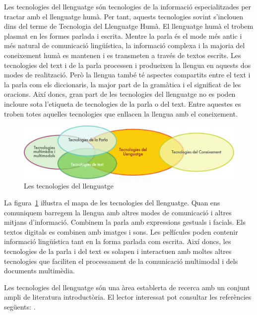 \begin{multicols}{2}

Les tecnologies del llenguatge són tecnologies de la informació especialitzades per tractar amb el llenguatge humà. Per tant, aquests tecnologies sovint s’inclouen dins del terme de Tecnologia del Llenguatge Humà. El llenguatge humà el trobem plasmat en les formes parlada i escrita. Mentre la parla és el mode més antic i més natural de comunicació lingüística, la informació complexa i la majoria del coneixement humà es mantenen i es transmeten a través de textos escrits. Les tecnologies del text i de la parla processen i produeixen la llengua en aquests dos modes de realització. Però la llengua també té aspectes compartits entre el text i la parla com els diccionaris, la major part de la gramàtica i el significat de les oracions. Així doncs, gran part de les tecnologies del llenguatge no es poden incloure sota l’etiqueta de tecnologies de la parla o del text. Entre aquestes es troben totes aquelles tecnologies que enllacen la llengua amb el coneixement.


\begin{figure}[htb]
  \center
  \includegraphics[width=\textwidth]{../_media/catalan/language_technologies}
  \caption{Les tecnologies del llenguatge}
  \label{fig:ltincontext_ca}
\end{figure}

 La figura~\ref{fig:ltincontext_ca} iŀlustra el mapa de les tecnologies del llenguatge. Quan ens comuniquem barregem la llengua amb altres modes de comunicació i altres mitjans d’informació. Combinem la parla amb expressions gestuals i facials. Els textos digitals es combinen amb imatges i sons. Les peŀlícules poden contenir informació lingüística tant en la forma parlada com escrita. Així doncs, les tecnologies de la parla i del text es solapen i interactuen amb moltes altres tecnologies que faciliten el processament de la comunicació multimodal i dels documents multimèdia.

Les tecnologies del llenguatge són una àrea establerta de recerca amb un conjunt ampli de literatura introductòria. El lector interessat pot consultar les referències següents: \cite{jurafsky-martin01, manning-schuetze1, lt-world1, lt-survey1}.


\end{multicols}
